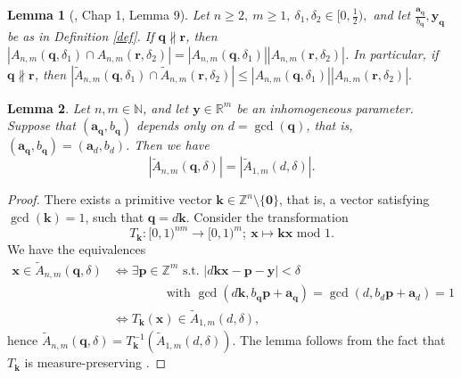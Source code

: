 \documentclass[reqno]{amsart}
\newtheorem{lemma}{Lemma}
\theoremstyle{definition}
\theoremstyle{remark}
\begin{document}
\begin{lemma}[\cite{Spr79}, Chap 1, Lemma 9] \label{notparallel}
    Let $n \geq 2,\ m \geq 1,\ \delta_1, \delta_2 \in [0,\frac{1}{2}),$ and let $\frac{\mathbf{a}_\mathbf{q}}{b_\mathbf{q}}, \mathbf{y}_\mathbf{q}$ be as in Definition \ref{def}. If $\mathbf{q} \nparallel \mathbf{r}$, then $|A_{n,m}(\mathbf{q}, \delta_1) \cap A_{n,m}(\mathbf{r}, \delta_2)| = |A_{n,m}(\mathbf{q},\delta_1)| |A_{n,m}(\mathbf{r},\delta_2)|$. In particular, if $\mathbf{q} \nparallel \mathbf{r}$, then $|\tilde{A}_{n,m}(\mathbf{q}, \delta_1) \cap \tilde{A}_{n,m}(\mathbf{r}, \delta_2)| \leq |A_{n,m}(\mathbf{q},\delta_1)| |A_{n,m}(\mathbf{r}, \delta_2)|.$
\end{lemma}

\begin{lemma}\label{onedimension}
    Let $n,m \in \mathbb{N}$, and let $\mathbf{y} \in \mathbb{R}^m$ be an inhomogeneous parameter. Suppose that $(\mathbf{a}_\mathbf{q}, b_\mathbf{q})$ depends only on $d= \gcd(\mathbf{q})$, that is, $(\mathbf{a}_\mathbf{q}, b_\mathbf{q}) = (\mathbf{a}_d, b_d)$. Then we have
    $$|\tilde{A}_{n,m}(\mathbf{q}, \delta)| = |\tilde{A}_{1,m}(d, \delta)|.$$
\end{lemma}
\begin{proof}
    There exists a primitive vector $\mathbf{k} \in \mathbb{Z}^n \setminus \{\mathbf{0}\}$, that is, a vector satisfying $\gcd(\mathbf{k}) = 1$, such that $\mathbf{q} = d\mathbf{k}.$ Consider the transformation
    $$T_\mathbf{k} : [0,1)^{nm} \to [0,1)^m ;\ \mathbf{x} \mapsto \mathbf{kx} \text{ mod } 1.$$
    We have the equivalences
    \begin{align*}
        \mathbf{x} \in \tilde{A}_{n,m}(\mathbf{q}, \delta) 
        &\Leftrightarrow \exists \mathbf{p} \in \mathbb{Z}^m \text{ s.t. }|d\mathbf{kx} - \mathbf{p} - \mathbf{y}| < \delta  \\
        &\qquad \qquad \text{ with } \gcd(d\mathbf{k}, b_\mathbf{q}\mathbf{p} + \mathbf{a}_\mathbf{q}) = \gcd(d, b_d \mathbf{p} + \mathbf{a}_d) = 1 \\
        &\Leftrightarrow T_\mathbf{k}(\mathbf{x}) \in \tilde{A}_{1,m}(d, \delta),
    \end{align*}
    hence $\tilde{A}_{n,m}(\mathbf{q}, \delta) = T_\mathbf{k}^{-1}(\tilde A_{1,m}(d, \delta)).$ The lemma follows from the fact that $T_\mathbf{k}$ is measure-preserving \cite[Chap 1, Lemma 8]{Spr79}.
\end{proof}
\end{document}
